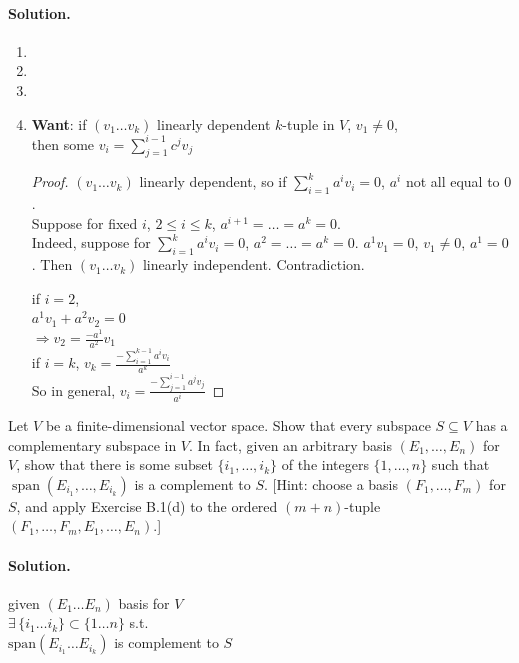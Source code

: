 \paragraph{Solution.}
\begin{enumerate}
  \item[(a)]
\item[(b)]
\item[(c)]
\item[(d)] \textbf{Want}: if $(v_1 \dots v_k)$ linearly dependent $k$-tuple in $V$, $v_1 \neq 0$, \\
then some $v_i = \sum_{j=1}^{i-1} c^j v_j$ \\
\begin{proof}
$(v_1 \dots v_k)$ linearly dependent, so if $\sum_{i=1}^k a^i v_i = 0$, $a^i$ not all equal to $0$.  \\

Suppose for fixed $i$, $2\leq i \leq k$, $a^{i+1} = \dots =a^k=0$. \\
\quad Indeed, suppose for $\sum_{i=1}^k a^i v_i = 0$, $a^2 = \dots = a^k = 0$.  $a^1 v_1 =0$, $v_1 \neq 0$, $a^1 =0$.  Then $(v_1 \dots v_k)$ linearly independent.  Contradiction.  

if $i=2$, \\
\phantom{\quad} $a^1 v_1 + a^2 v_2 =0$ \\
\phantom{\quad \,} $\Longrightarrow v_2  = \frac{-a^1}{a^2} v_1$ \\

if $i=k$, $v_k = \frac{ -\sum_{i=1}^{k-1} a^i v_i }{ a^k}$  \\

So in general, $v_i = \frac{ -\sum_{j=1}^{i-1} a^j v_j }{ a^i}$
\end{proof}
\end{enumerate}

\begin{exercise}
Let $V$ be a finite-dimensional vector space. Show that every subspace $S\subseteq V$ has a complementary subspace in $V$. In fact, given an arbitrary basis $(E_1,\ldots,E_n)$ for $V$, show that there is some subset $\{i_1,\ldots,i_k\}$ of the integers $\{1,\ldots,n\}$ such that $\operatorname{span}(E_{i_1},\ldots,E_{i_k})$ is a complement to $S$. [Hint: choose a basis $(F_1,\ldots,F_m)$ for $S$, and apply Exercise B.1(d) to the ordered $(m+n)$-tuple $(F_1,\ldots,F_m,E_1,\ldots,E_n)$.]
\end{exercise}
\paragraph{Solution.}
given $(E_1 \dots E_n)$ basis for $V$ \\
\phantom{ \quad } $\exists \, \lbrace i_1 \dots i_k \rbrace \subset \lbrace 1 \dots n \rbrace$ s.t. \\
\phantom{ \quad \, } $ \text{span}(E_{i_1} \dots E_{i_k} )$ is complement to $S$ \\

